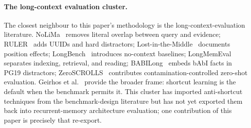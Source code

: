 \documentclass{article}
\begin{document}
\paragraph{The long-context evaluation cluster.}  The closest
neighbour to this paper's methodology is the long-context-evaluation
literature.  NoLiMa~\cite{nolima2025} removes literal overlap between
query and evidence; RULER~\cite{ruler2024} adds UUIDs and hard
distractors; Lost-in-the-Middle~\cite{lostmiddle2024} documents
position effects; LongBench~\cite{longbench2024} introduces
no-context baselines; LongMemEval~\cite{longmemeval2025} separates
indexing, retrieval, and reading; BABILong~\cite{babilong2024} embeds
bAbI facts in PG19 distractors; ZeroSCROLLS~\cite{zeroscrolls2023}
contributes contamination-controlled zero-shot evaluation.
Geirhos et al.~\cite{shortcut2020} provide the broader frame:
shortcut learning is the default when the benchmark permits it.  This
cluster has imported anti-shortcut techniques from the
benchmark-design literature but has not yet exported them back into
recurrent-memory architecture evaluation; one contribution of this
paper is precisely that re-export.
\end{document}
